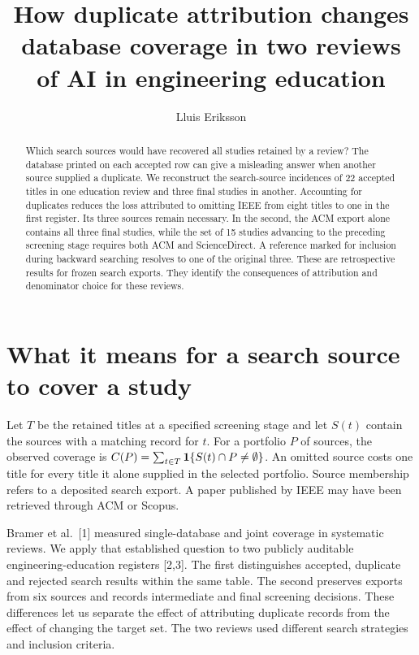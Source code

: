 \documentclass[11pt]{article}
\title{How duplicate attribution changes database coverage in two reviews of AI in engineering education}
\author{Lluis Eriksson}
\date{}
\begin{document}
\maketitle
\begin{abstract}
Which search sources would have recovered all studies retained by a review? The database printed on each accepted row can give a misleading answer when another source supplied a duplicate. We reconstruct the search-source incidences of 22 accepted titles in one education review and three final studies in another. Accounting for duplicates reduces the loss attributed to omitting IEEE from eight titles to one in the first register. Its three sources remain necessary. In the second, the ACM export alone contains all three final studies, while the set of 15 studies advancing to the preceding screening stage requires both ACM and ScienceDirect. A reference marked for inclusion during backward searching resolves to one of the original three. These are retrospective results for frozen search exports. They identify the consequences of attribution and denominator choice for these reviews.
\end{abstract}
\section{What it means for a search source to cover a study}
Let $T$ be the retained titles at a specified screening stage and let $S(t)$ contain the sources with a matching record for $t$. For a portfolio $P$ of sources, the observed coverage is $C(P)=\sum_{t\in T} {\bf1}\{S(t)\cap P\ne\emptyset\}$. An omitted source costs one title for every title it alone supplied in the selected portfolio. Source membership refers to a deposited search export. A paper published by IEEE may have been retrieved through ACM or Scopus.
 
Bramer et al.\ [1] measured single-database and joint coverage in systematic reviews. We apply that established question to two publicly auditable engineering-education registers [2,3]. The first distinguishes accepted, duplicate and rejected search results within the same table. The second preserves exports from six sources and records intermediate and final screening decisions. These differences let us separate the effect of attributing duplicate records from the effect of changing the target set. The two reviews used different search strategies and inclusion criteria.

\newpage
\end{document}
